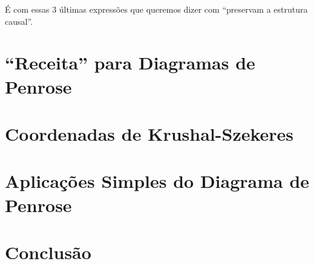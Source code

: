 \documentclass[12pt, a4paper]{article}
\theoremstyle{meuremarkstyle}
\theoremstyle{definicao}
\begin{document}
É com essas 3 últimas expressões que queremos dizer com \enquote{preservam a estrutura causal}.

\section{\enquote{Receita} para Diagramas de Penrose}
\section{Coordenadas de Krushal-Szekeres}
\section{Aplicações Simples do Diagrama de Penrose}
\section{Conclusão}





\newpage
{}
\nocite{*}
\printbibliography[title={Referências}]
\end{document}
